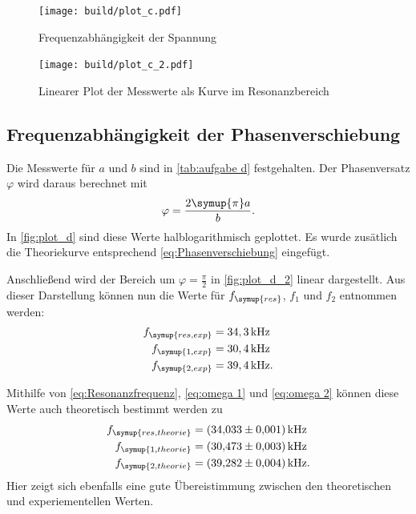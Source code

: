 \begin{figure} [H]
  \centering
  \texttt{[image: build/plot\_c.pdf]}
  \caption{Frequenzabhängigkeit der Spannung}
  \label{fig:plot_c}
\end{figure}

\begin{figure} [H]
  \centering
  \texttt{[image: build/plot\_c\_2.pdf]}
  \caption{Linearer Plot der Messwerte als Kurve im Resonanzbereich}
  \label{fig:plot_c_2}
\end{figure}

\subsection{Frequenzabhängigkeit der Phasenverschiebung}
\label{sec:Frequenzabhängigkeit der Phasenverschiebung}

Die Messwerte für $a$ und $b$ sind in \autoref{tab:aufgabe d} festgehalten.
Der Phasenversatz $\varphi$ wird daraus berechnet mit
\begin{equation}
  \varphi=\frac{2\symup{\pi} a}{b}.
\end{equation}
In \autoref{fig:plot_d} sind diese Werte halblogarithmisch geplottet.
Es wurde zusätlich die Theoriekurve entsprechend \eqref{eq:Phasenverschiebung} eingefügt.

Anschließend wird der Bereich um $\varphi=\frac{\pi}{2}$ in \autoref{fig:plot_d_2} linear dargestellt.
Aus dieser Darstellung können nun die Werte für $f_{\symup{res}}$, $f_{1}$ und $f_{2}$ entnommen werden:
\begin{align*}
  f_{\symup{res, exp}} &= 34,3\,\unit{\kilo\hertz} \\
  f_{\symup{1,exp}} &= 30,4\,\unit{\kilo\hertz} \\
  f_{\symup{2,exp}} &= 39,4\,\unit{\kilo\hertz}.
\end{align*}

Mithilfe von \eqref{eq:Resonanzfrequenz}, \eqref{eq:omega 1} und \eqref{eq:omega 2} können diese Werte auch theoretisch bestimmt werden zu
\begin{align*}
  f_{\symup{res, theorie}} &= \qty{34.033+-0.001}{\kilo\hertz} \\
  f_{\symup{1,theorie}} &= \qty{30.473+-0.003}{\kilo\hertz} \\
  f_{\symup{2,theorie}} &= \qty{39.282+-0.004}{\kilo\hertz}.
\end{align*}
Hier zeigt sich ebenfalls eine gute Übereistimmung zwischen den theoretischen und experiementellen Werten.

